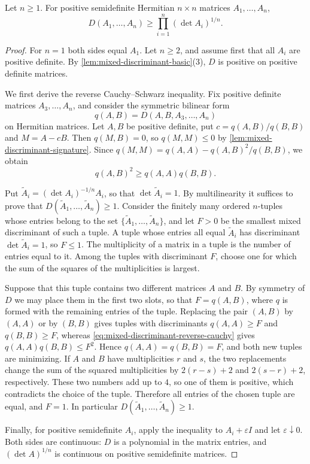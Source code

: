 \begin{lemma}\label{lem:multifactor-mixed-discriminant}
Let $n\geq1$. For positive semidefinite Hermitian $n\times n$ matrices $A_1,\ldots,A_n$,
\[
 D(A_1,\ldots,A_n)\geq\prod_{i=1}^n(\det A_i)^{1/n}.
\]
\end{lemma}
\begin{proof}
For $n=1$ both sides equal $A_1$. Let $n\geq2$, and assume first that all $A_i$ are positive definite. By \cref{lem:mixed-discriminant-basic}(3), $D$ is positive on positive definite matrices.

We first derive the reverse Cauchy--Schwarz inequality. Fix positive definite matrices $A_3,\ldots,A_n$, and consider the symmetric bilinear form
\[
 q(A,B)=D(A,B,A_3,\ldots,A_n)
\]
on Hermitian matrices. Let $A,B$ be positive definite, put $c=q(A,B)/q(B,B)$ and $M=A-cB$. Then $q(M,B)=0$, so $q(M,M)\leq0$ by \cref{lem:mixed-discriminant-signature}. Since $q(M,M)=q(A,A)-q(A,B)^2/q(B,B)$, we obtain
\begin{equation}\label{eq:mixed-discriminant-reverse-cauchy}
 q(A,B)^2\geq q(A,A)q(B,B).
\end{equation}

Put $\widetilde A_i=(\det A_i)^{-1/n}A_i$, so that $\det\widetilde A_i=1$. By multilinearity it suffices to prove that $D(\widetilde A_1,\ldots,\widetilde A_n)\geq1$. Consider the finitely many ordered $n$-tuples whose entries belong to the set $\{\widetilde A_1,\ldots,\widetilde A_n\}$, and let $F>0$ be the smallest mixed discriminant of such a tuple. A tuple whose entries all equal $\widetilde A_i$ has discriminant $\det\widetilde A_i=1$, so $F\leq1$. The multiplicity of a matrix in a tuple is the number of entries equal to it. Among the tuples with discriminant $F$, choose one for which the sum of the squares of the multiplicities is largest.

Suppose that this tuple contains two different matrices $A$ and $B$. By symmetry of $D$ we may place them in the first two slots, so that $F=q(A,B)$, where $q$ is formed with the remaining entries of the tuple. Replacing the pair $(A,B)$ by $(A,A)$ or by $(B,B)$ gives tuples with discriminants $q(A,A)\geq F$ and $q(B,B)\geq F$, whereas \eqref{eq:mixed-discriminant-reverse-cauchy} gives $q(A,A)q(B,B)\leq F^2$. Hence $q(A,A)=q(B,B)=F$, and both new tuples are minimizing. If $A$ and $B$ have multiplicities $r$ and $s$, the two replacements change the sum of the squared multiplicities by $2(r-s)+2$ and $2(s-r)+2$, respectively. These two numbers add up to $4$, so one of them is positive, which contradicts the choice of the tuple. Therefore all entries of the chosen tuple are equal, and $F=1$. In particular $D(\widetilde A_1,\ldots,\widetilde A_n)\geq1$.

Finally, for positive semidefinite $A_i$, apply the inequality to $A_i+\varepsilon I$ and let $\varepsilon\downarrow0$. Both sides are continuous: $D$ is a polynomial in the matrix entries, and $(\det A)^{1/n}$ is continuous on positive semidefinite matrices.
\end{proof}

